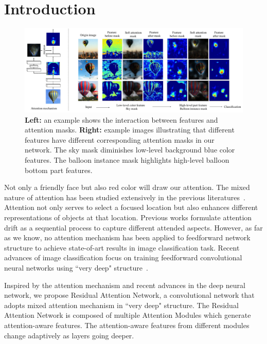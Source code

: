 \documentclass[10pt,twocolumn,letterpaper]{article}
\begin{document}
\section{Introduction}

\begin{figure}
\begin{center}
\includegraphics[width=1\linewidth]{motivation.pdf}
\end{center}
   \caption{\textbf{Left:} an example shows the interaction between features and attention masks. \textbf{Right:} example images illustrating that different features have different corresponding attention masks in our network. The sky mask diminishes low-level background blue color features. The balloon instance mask highlights high-level balloon bottom part features.}
\label{fig:motivation}
\end{figure}

Not only a friendly face but also red color will draw our attention. The mixed nature of attention has been studied extensively in the previous literatures~\cite{walther2002attentional, itti2001computational,mnih2014recurrent,zhao2016diversified}. Attention not only serves to select a focused location but also enhances different representations of objects at that location. Previous works formulate attention drift as a sequential process to capture different attended aspects. However, as far as we know, no attention mechanism has been applied to feedforward network structure to achieve state-of-art results in image classification task. Recent advances of image classification focus on training feedforward convolutional neural networks using ``very deep" structure~\cite{simonyan2014very,szegedy2015going,resnet2016}.

Inspired by the attention mechanism and recent advances in the deep neural network, we propose Residual Attention Network, a convolutional network that adopts mixed attention mechanism in ``very deep" structure. The Residual Attention Network is composed of multiple Attention Modules which generate attention-aware features. The attention-aware features from different modules change adaptively as layers going deeper.
\end{document}
